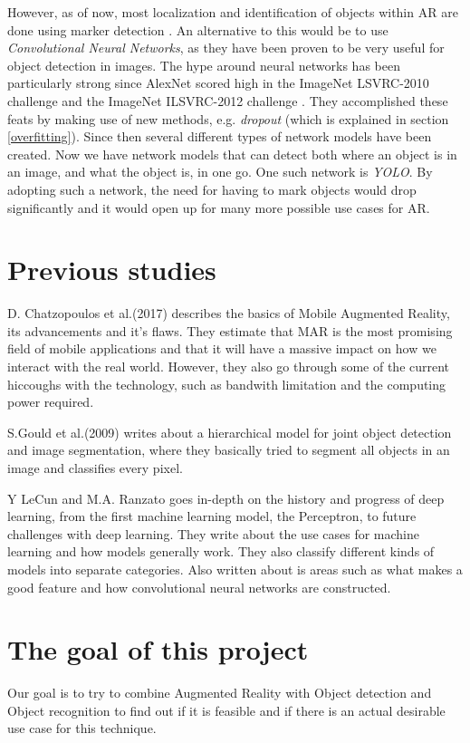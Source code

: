 However, as of now, most localization and identification of objects within AR are done using 
marker detection \cite{markerDetection}. An alternative to this would be to use 
\textit{Convolutional Neural Networks}, as they have been proven to be very useful for 
object detection in 
images. The hype around neural networks has been particularly strong since AlexNet scored 
high in the ImageNet LSVRC-2010 challenge and the ImageNet ILSVRC-2012 challenge 
\cite{NIPS2012_4824}. They accomplished these feats by making use of new methods, e.g. 
\textit{dropout} (which is explained in section \ref{overfitting}). Since then several different types of network models have been created. 
Now we have network models that can detect both where an object is in an image, and what 
the object is, in one go. One such network is \textit{YOLO}\cite{YOLO1}. By adopting such a 
network, the need for having to mark objects would drop significantly and it would open up 
for many more possible use cases for AR.
 
\section{Previous studies}
\label{subsecPrevStud}
D. Chatzopoulos et al.(2017) describes the basics of Mobile Augmented Reality, its advancements and it's flaws. They estimate that MAR is the most promising field of mobile applications and that it will have a massive impact on how we interact with the real world. However, they also go through some of the current hiccoughs with the technology, such as bandwith limitation and the computing power required. 
\cite{MARS}

S.Gould et al.(2009) writes about a hierarchical model for joint object detection and image segmentation, where they basically tried to segment all objects in an image and classifies every pixel. 
\cite{NIPS2009_3766}


Y LeCun and M.A. Ranzato goes in-depth on the history and progress of deep learning, from the first machine learning model, the Perceptron, to future challenges with deep learning. They write about the use cases for machine learning and how models generally work. They also classify different kinds of models into separate categories. Also written about is areas such as what makes a good feature and how convolutional neural networks are constructed.
\cite{deepLearningTutorial}


\section{The goal of this project}
\label{subsecGoal}
Our goal is to try to combine Augmented Reality with Object detection and Object recognition to find out if it is feasible and if there is an actual desirable use case for this technique. 

